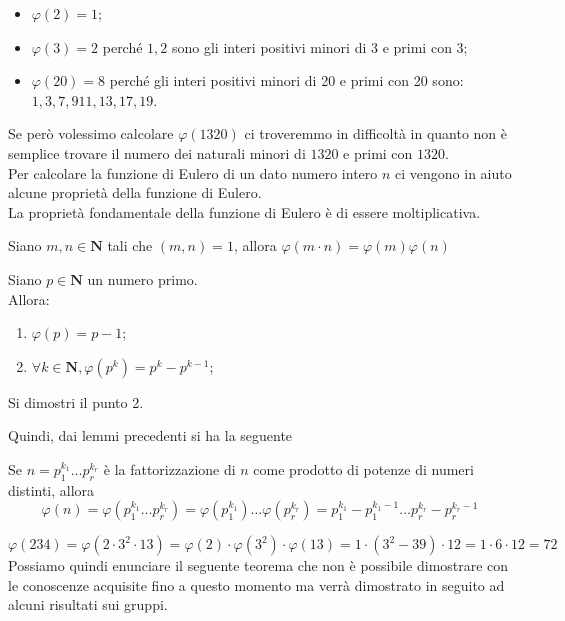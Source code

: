 \begin{flushleft}
\begin{esempio}

\end{esempio}
\begin{itemize}
    \item $\varphi(2) = 1$;
    \item $\varphi(3) = 2$ perché $1,2$ sono gli interi positivi minori di $3$ e primi con 3;
    \item $\varphi(20) = 8$ perché gli interi positivi minori di 20 e primi con 20 sono: $1, 3, 7, 9 11, 13, 17, 19$.
\end{itemize}
Se però volessimo calcolare $\varphi(1320)$ ci troveremmo in difficoltà in quanto non è semplice trovare il numero dei naturali minori di $1320$ e primi con $1320$.\\
Per calcolare la funzione di Eulero di un dato numero intero $n$ ci vengono in aiuto alcune proprietà della funzione di Eulero.\\
La proprietà fondamentale della funzione di Eulero è di essere moltiplicativa.

\begin{lemma}
Siano $m, n\in \mathbf{N}$ tali che $(m, n) = 1$, allora $\varphi(m\cdot n) =\varphi(m)\varphi(n) $
\end{lemma}

\begin{lemma}
Siano $p\in \mathbf{N}$ un numero primo.\\
Allora:
\begin{enumerate}
    \item $\varphi(p) = p-1$;
    \item $\forall k \in \mathbf{N}, \varphi(p^k) = p^k - p^{k-1}$;
\end{enumerate}
\end{lemma}
\begin{esercizio}
Si dimostri il punto 2.
\end{esercizio}
\vspace{150px}
Quindi, dai lemmi precedenti si ha la seguente
\begin{proposizione}
Se $n = p_1^{k_1} \hdots p_r^{k_r}$ è la fattorizzazione di $n$ come prodotto di potenze di numeri distinti, allora
\[\varphi(n) = \varphi(p_1^{k_1} \hdots p_r^{k_r}) = \varphi(p_1^{k_1})\hdots \varphi(p_r^{k_r}) = p_1^{k_1}-p_1^{k_1-1}\hdots p_r^{k_r}-p_r^{k_r-1}\]
\end{proposizione}
\begin{esempio}

\end{esempio}
\[\varphi(234) = \varphi(2\cdot 3^2 \cdot 13) = \varphi(2) \cdot\varphi(3^2)\cdot\varphi(13) = 1\cdot (3^2-39)\cdot 12 = 1\cdot 6\cdot 12 = 72\]
Possiamo quindi enunciare il seguente teorema che non è possibile dimostrare con le conoscenze acquisite fino a questo momento ma verrà dimostrato in seguito ad alcuni risultati sui gruppi.


\end{flushleft}
